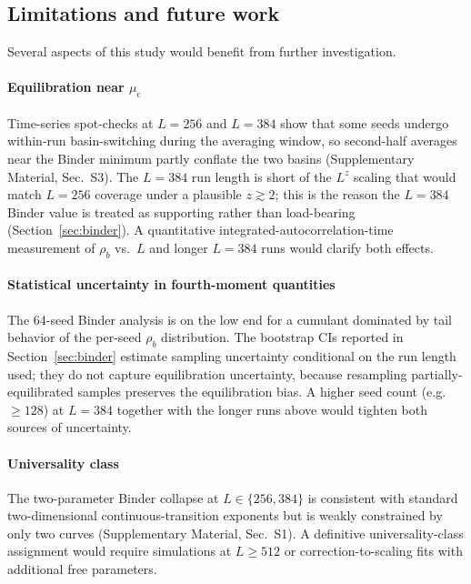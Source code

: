 \documentclass[preprint,12pt]{elsarticle}
\newcommand{\rb}{\rho_b}              %
\newcommand{\mc}{\mu_\mathrm{c}}      %
\newcommand{\Lsys}{L}                 %
\begin{document}
\subsection{Limitations and future work}

Several aspects of this study would benefit from further
investigation.

\paragraph{Equilibration near $\mc$}
Time-series spot-checks at $\Lsys = 256$ and $\Lsys = 384$
show that some seeds undergo within-run basin-switching
during the averaging window, so second-half averages near
the Binder minimum partly conflate the two basins
(Supplementary Material, Sec.~S3).
The $\Lsys = 384$ run length is short of the $\Lsys^z$
scaling that would match $\Lsys = 256$ coverage under a
plausible $z \gtrsim 2$; this is the reason the
$\Lsys = 384$ Binder value is treated as supporting rather
than load-bearing (Section~\ref{sec:binder}).
A quantitative integrated-autocorrelation-time measurement
of $\rb$ vs.\ $\Lsys$ and longer $\Lsys = 384$ runs would
clarify both effects.

\paragraph{Statistical uncertainty in fourth-moment
quantities}
The 64-seed Binder analysis is on the low end for a
cumulant dominated by tail behavior of the per-seed $\rb$
distribution.
The bootstrap CIs reported in Section~\ref{sec:binder}
estimate sampling uncertainty conditional on the run length
used; they do not capture equilibration uncertainty, because
resampling partially-equilibrated samples preserves the
equilibration bias.
A higher seed count (e.g.\ $\geq 128$) at $\Lsys = 384$
together with the longer runs above would tighten both
sources of uncertainty.

\paragraph{Universality class}
The two-parameter Binder collapse at
$\Lsys \in \{256, 384\}$ is consistent with standard
two-dimensional continuous-transition exponents but is
weakly constrained by only two curves
(Supplementary Material, Sec.~S1).
A definitive universality-class assignment would require
simulations at $\Lsys \geq 512$ or correction-to-scaling
fits with additional free parameters.
\end{document}
